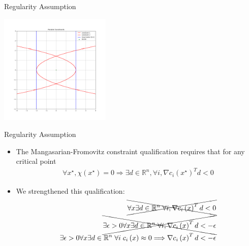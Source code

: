 \documentclass{beamer}
\newcommand{\Rn}{\mathbb R ^ {n}}
\begin{document}
\begin{frame}{Regularity Assumption}
	\begin{center}
		\includegraphics[width=200px]{images/local_regularity.png}
	\end{center}
\end{frame}

\begin{frame}{Regularity Assumption}
\begin{itemize}
\item The Mangasarian-Fromovitz constraint qualification requires that for any critical point 
\begin{align*}
\forall x^{\star}, \chi\left(x^{\star}\right) = 0 
\Longrightarrow \exists d \in \Rn, \forall i, \nabla c_i\left(x^{\star}\right)^T d < 0 
\end{align*}
\item We strengthened this qualification:
\begin{align*}
\xcancel{\forall x \exists d \in \Rn\; \forall i, \nabla c_i\left(x\right)^T d < 0} \\
\xcancel{\exists \epsilon>0 \forall x \exists d \in \Rn\; \forall i, \nabla c_i\left(x\right)^T d < -\epsilon} \\
\exists \epsilon>0 \forall x\exists d\in \Rn\; \forall i\; c_i\left(x\right) \approx 0
\Longrightarrow \nabla c_i\left(x\right)^T d < -\epsilon \\
\end{align*}
\end{itemize}
\end{frame}
\end{document}
